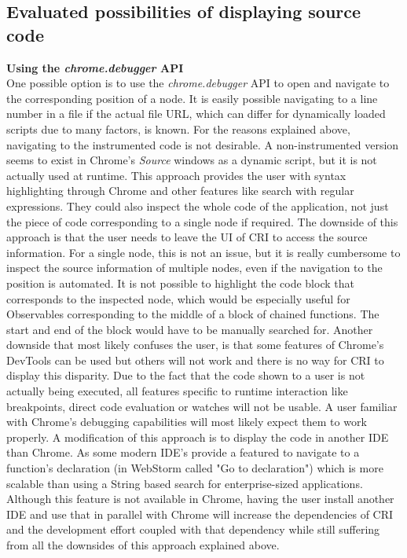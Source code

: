 \subsection{Evaluated possibilities of displaying source code}
\textbf{Using the \emph{chrome.debugger} API}\\
One possible option is to use the \emph{chrome.debugger} API to open and navigate to the corresponding position of a node. It is easily possible navigating to a line number in a file if the actual file URL, which can differ for dynamically loaded scripts due to many factors, is known. For the reasons explained above, navigating to the instrumented code is not desirable. A non-instrumented version seems to exist in Chrome's \emph{Source} windows as a dynamic script, but it is not actually used at runtime. This approach provides the user with syntax highlighting through Chrome and other features like search with regular expressions. They could also inspect the whole code of the application, not just the piece of code corresponding to a single node if required. The downside of this approach is that the user needs to leave the UI of CRI to access the source information. For a single node, this is not an issue, but it is really cumbersome to inspect the source information of multiple nodes, even if the navigation to the position is automated. It is not possible to highlight the code block that corresponds to the inspected node, which would be especially useful for Observables corresponding to the middle of a block of chained functions. The start and end of the block would have to be manually searched for. Another downside that most likely confuses the user, is that some features of Chrome's DevTools can be used but others will not work and there is no way for CRI to display this disparity. Due to the fact that the code shown to a user is not actually being executed, all features specific to runtime interaction like breakpoints, direct code evaluation or watches will not be usable. A user familiar with Chrome's debugging capabilities will most likely expect them to work properly. A modification of this approach is to display the code in another IDE than Chrome. As some modern IDE's provide a featured to navigate to a function's declaration (in WebStorm called "Go to declaration") which is more scalable than using a String based search for enterprise-sized applications. Although this feature is not available in Chrome, having the user install another IDE and use that in parallel with Chrome will increase the dependencies of CRI and the development effort coupled with that dependency while still suffering from all the downsides of this approach explained above.\\
